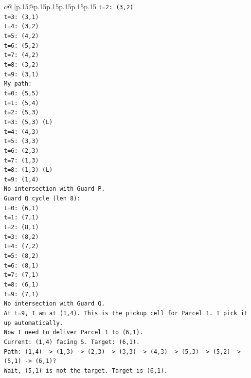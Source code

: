 \documentclass{article}
\begin{document}
{\begin{supertabular}{c@{$\;$}|p{.15\linewidth}@{}p{.15\linewidth}p{.15\linewidth}p{.15\linewidth}p{.15\linewidth}p{.15\linewidth}}
{{{\texttt{t=2: (3,2)} \\
\texttt{t=3: (3,1)} \\
\texttt{t=4: (3,2)} \\
\texttt{t=5: (4,2)} \\
\texttt{t=6: (5,2)} \\
\texttt{t=7: (4,2)} \\
\texttt{t=8: (3,2)} \\
\texttt{t=9: (3,1)} \\
\texttt{My path:} \\
\texttt{t=0: (5,5)} \\
\texttt{t=1: (5,4)} \\
\texttt{t=2: (5,3)} \\
\texttt{t=3: (5,3) (L)} \\
\texttt{t=4: (4,3)} \\
\texttt{t=5: (3,3)} \\
\texttt{t=6: (2,3)} \\
\texttt{t=7: (1,3)} \\
\texttt{t=8: (1,3) (L)} \\
\texttt{t=9: (1,4)} \\
\texttt{No intersection with Guard P.} \\
\texttt{Guard Q cycle (len 8):} \\
\texttt{t=0: (6,1)} \\
\texttt{t=1: (7,1)} \\
\texttt{t=2: (8,1)} \\
\texttt{t=3: (8,2)} \\
\texttt{t=4: (7,2)} \\
\texttt{t=5: (8,2)} \\
\texttt{t=6: (8,1)} \\
\texttt{t=7: (7,1)} \\
\texttt{t=8: (6,1)} \\
\texttt{t=9: (7,1)} \\
\texttt{No intersection with Guard Q.} \\
\texttt{At t=9, I am at (1,4). This is the pickup cell for Parcel 1. I pick it up automatically.} \\
\texttt{Now I need to deliver Parcel 1 to (6,1).} \\
\texttt{Current: (1,4) facing S. Target: (6,1).} \\
\texttt{Path: (1,4) {-}> (1,3) {-}> (2,3) {-}> (3,3) {-}> (4,3) {-}> (5,3) {-}> (5,2) {-}> (5,1) {-}> (6,1)?} \\
\texttt{Wait, (5,1) is not the target. Target is (6,1).} \\
}}}
\end{supertabular}}
\end{document}
